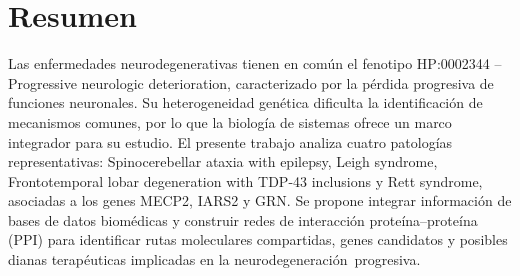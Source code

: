 \section{Resumen}
Las enfermedades neurodegenerativas tienen en común el fenotipo HP:0002344 – Progressive neurologic deterioration, caracterizado por la pérdida progresiva de funciones neuronales. Su heterogeneidad genética dificulta la identificación de mecanismos comunes, por lo que la biología de sistemas ofrece un marco integrador para su estudio. El presente trabajo analiza cuatro patologías representativas: Spinocerebellar ataxia with epilepsy, Leigh syndrome, Frontotemporal lobar degeneration with TDP-43 inclusions y Rett syndrome, asociadas a los genes MECP2, IARS2 y GRN. Se propone integrar información de bases de datos biomédicas y construir redes de interacción proteína–proteína (PPI) para identificar rutas moleculares compartidas, genes candidatos y posibles dianas terapéuticas implicadas en la neurodegeneración progresiva.
